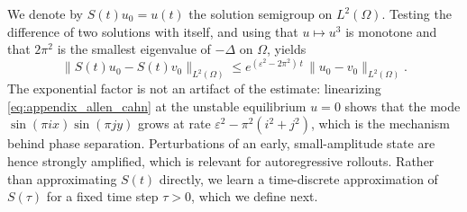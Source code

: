 \documentclass{article} %
\begin{document}
We denote by $S(t)u_0 = u(t)$ the solution semigroup on $L^2(\Omega)$. Testing the difference of two solutions with itself, and using that $u\mapsto u^3$ is monotone and that $2\pi^2$ is the smallest eigenvalue of $-\Delta$ on $\Omega$, yields
\begin{equation}\label{eq:appendix_ac_stability}
   \|S(t)u_0 - S(t)v_0\|_{L^2(\Omega)} \leq e^{(\varepsilon^2 - 2\pi^2)\,t}\,\|u_0 - v_0\|_{L^2(\Omega)}.
\end{equation}
The exponential factor is not an artifact of the estimate: linearizing \eqref{eq:appendix_allen_cahn} at the unstable equilibrium $u = 0$ shows that the mode $\sin(\pi i x)\sin(\pi j y)$ grows at rate $\varepsilon^2 - \pi^2(i^2 + j^2)$, which is the mechanism behind phase separation. Perturbations of an early, small-amplitude state are hence strongly amplified, which is relevant for autoregressive rollouts. Rather than approximating $S(t)$ directly, we learn a time-discrete approximation of $S(\tau)$ for a fixed time step $\tau > 0$, which we define next.
\end{document}
